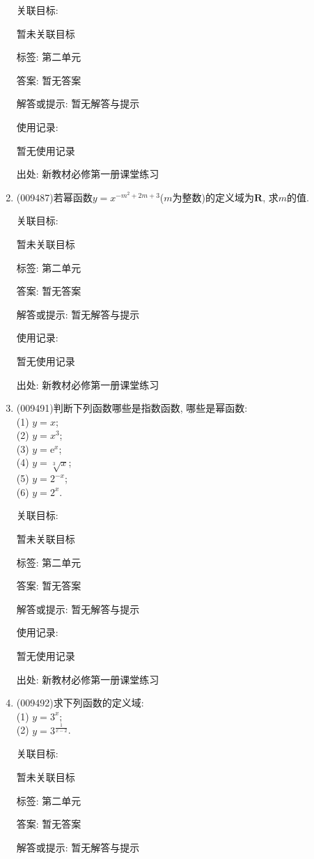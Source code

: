 \documentclass[10pt,a4paper]{article}
\begin{document}
\begin{enumerate}[1.]
关联目标:

暂未关联目标



标签: 第二单元

答案: 暂无答案

解答或提示: 暂无解答与提示

使用记录:

暂无使用记录


出处: 新教材必修第一册课堂练习
\item { (009487)}若幂函数$y=x^{-m^2+2m+3}$($m$为整数)的定义域为$\mathbf{R}$, 求$m$的值.


关联目标:

暂未关联目标



标签: 第二单元

答案: 暂无答案

解答或提示: 暂无解答与提示

使用记录:

暂无使用记录


出处: 新教材必修第一册课堂练习
\item { (009491)}判断下列函数哪些是指数函数, 哪些是幂函数:\\
(1) $y=x$;\\
(2) $y=x^3$;\\
(3) $y=\mathrm{e}^x$;\\
(4) $y=\sqrt[3]{x}$;\\
(5) $y=2^{-x}$;\\
(6) $y=2^x$.


关联目标:

暂未关联目标



标签: 第二单元

答案: 暂无答案

解答或提示: 暂无解答与提示

使用记录:

暂无使用记录


出处: 新教材必修第一册课堂练习
\item { (009492)}求下列函数的定义域:\\
(1) $y=3^x$;\\
(2) $y=3^{\frac 1{x-2}}$.


关联目标:

暂未关联目标



标签: 第二单元

答案: 暂无答案

解答或提示: 暂无解答与提示


\end{enumerate}
\end{document}
